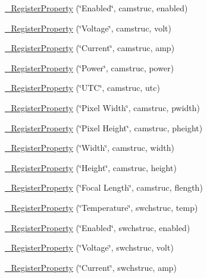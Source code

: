 \begin{DoxyCompactItemize}
\item 
\hyperlink{namespacecubesat_a56f40a8c7426b1c0c1c15ce88b12488b}{\+\_\+\+Register\+Property} (\char`\"{}Enabled\char`\"{}, camstruc, enabled)
\item 
\hyperlink{namespacecubesat_a3e7e7627d531946f335bf9872b27aa94}{\+\_\+\+Register\+Property} (\char`\"{}Voltage\char`\"{}, camstruc, volt)
\item 
\hyperlink{namespacecubesat_a26ad24bd35018417014e92f829aa0f89}{\+\_\+\+Register\+Property} (\char`\"{}Current\char`\"{}, camstruc, amp)
\item 
\hyperlink{namespacecubesat_a3bccdf76728c77f0d244db3c1bf9137a}{\+\_\+\+Register\+Property} (\char`\"{}Power\char`\"{}, camstruc, power)
\item 
\hyperlink{namespacecubesat_a0d457561d0a8ffba79995bfb80b39885}{\+\_\+\+Register\+Property} (\char`\"{}U\+TC\char`\"{}, camstruc, utc)
\item 
\hyperlink{namespacecubesat_abcb5aad32d317bd92deae96a599f2835}{\+\_\+\+Register\+Property} (\char`\"{}Pixel Width\char`\"{}, camstruc, pwidth)
\item 
\hyperlink{namespacecubesat_a3da245d2c94085a1ab8e8536f1c5bdbf}{\+\_\+\+Register\+Property} (\char`\"{}Pixel Height\char`\"{}, camstruc, pheight)
\item 
\hyperlink{namespacecubesat_aa3a7688719bac052c068facf1b72dce8}{\+\_\+\+Register\+Property} (\char`\"{}Width\char`\"{}, camstruc, width)
\item 
\hyperlink{namespacecubesat_a18aaf6e50ef2ee655b4664b8cea0bfef}{\+\_\+\+Register\+Property} (\char`\"{}Height\char`\"{}, camstruc, height)
\item 
\hyperlink{namespacecubesat_a301e2495f63a6e395026c55263fb6efa}{\+\_\+\+Register\+Property} (\char`\"{}Focal Length\char`\"{}, camstruc, flength)
\item 
\hyperlink{namespacecubesat_ad39533f1569a5b7fb80587a91e3f44ed}{\+\_\+\+Register\+Property} (\char`\"{}Temperature\char`\"{}, swchstruc, temp)
\item 
\hyperlink{namespacecubesat_a67258e683b353e20e2671a21f04d451c}{\+\_\+\+Register\+Property} (\char`\"{}Enabled\char`\"{}, swchstruc, enabled)
\item 
\hyperlink{namespacecubesat_a5224528d62a50c5c543a5cf37660e4d8}{\+\_\+\+Register\+Property} (\char`\"{}Voltage\char`\"{}, swchstruc, volt)
\item 
\hyperlink{namespacecubesat_a31ce45fa78131286e97ac1cc7dfb034f}{\+\_\+\+Register\+Property} (\char`\"{}Current\char`\"{}, swchstruc, amp)

\end{DoxyCompactItemize}
